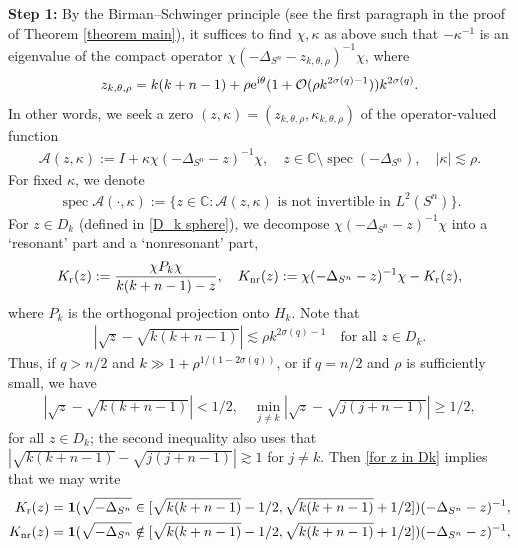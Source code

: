 \documentclass[12pt]{amsart}
\newcommand{\e}{{\rm e}}
\newcommand{\C}{{\mathbb C}}
\newcommand\I{\mathrm{i}}
\DeclareMathOperator{\spec}{spec}
\newcommand\jc[1]{\textcolor{black}{#1}}
\begin{document}
\textbf{Step 1:} By the Birman--Schwinger principle (see the first paragraph in the proof of Theorem \ref{theorem main}), it suffices to find $\chi,\kappa$ as above such that $-\kappa^{-1}$ is an eigenvalue of the compact operator $\chi(-\Delta_{S^n}-z_{k,\theta,\rho})^{-1}\chi$, where
\begin{align}\label{def z_k,theta,rho}
   z_{k,\theta,\rho}=k(k+n-1)+\rho\e^{\I\theta}(1+\mathcal{O}(\rho k^{2\sigma(q)-1})) k^{2\sigma(q)}.
\end{align}
In other words, we seek a zero $(z,\kappa)=(z_{k,\theta,\rho},\kappa_{k,\theta,\rho})$ of the operator-valued function 
\begin{align}\label{def A(zeta)}
    \mathcal{A}(z,\kappa):=I+\kappa\chi(-\Delta_{S^n}-z)^{-1}\chi,\quad z\in\C\setminus\spec(-\Delta_{S^n}),\quad|\kappa|\lesssim\rho.
\end{align}
For fixed $\kappa$, we denote 
\begin{align}
    \spec{\mathcal{A}(\cdot,\kappa)}:=\{z\in\C:\mathcal{A}(z,\kappa) \mbox{ is not invertible in } L^2(S^n)\}.
\end{align}
For $z\in D_k$ (defined in \eqref{D_k sphere}), we decompose $\chi(-\Delta_{S^n} - z)^{-1}\chi$ into a ‘resonant’ part and a ‘nonresonant’ part,
\begin{align}\label{def Ksing, Kreg}
K_{\rm r}(z):=\frac{\chi P_k\chi}{k(k+n-1)-z},\quad  K_{\rm nr}(z):=\chi(-\Delta_{S^n}-z)^{-1}\chi-K_{\rm r}(z), 
\end{align}
where $P_k$ is the orthogonal projection onto $H_k$.
Note that 
\begin{align}\label{for z in Dk}
    |\sqrt{z}-\sqrt{k(k+n-1)}|\lesssim \rho k^{2\sigma(q)-1}\quad\mbox{for all } z\in D_k.
\end{align}
Thus, if $q>n/2$ and \jc{$k\gg 1+\rho^{1/(1-2\sigma(q))}$}, or if $q=n/2$ and $\rho$ is sufficiently small, we have
\begin{align}
    |\sqrt{z}-\sqrt{k(k+n-1)}|<1/2,\quad \min_{j\neq k}|\sqrt{z}-\sqrt{j(j+n-1)}|\geq 1/2,
\end{align}
for all $z\in D_k$; the second inequality also uses that $|\sqrt{k(k+n-1)}-\sqrt{j(j+n-1)}|\gtrsim 1$ for $j\neq k$. Then \eqref{for z in Dk} implies that we may write
\begin{align}
 K_{\rm r}(z)&=\mathbf{1}(\sqrt{-\Delta_{S^n}}\in [\sqrt{k(k+n-1)}-1/2,\sqrt{k(k+n-1)}+1/2])(-\Delta_{S^n}-z)^{-1},\\   
 K_{\rm nr}(z)&=\mathbf{1}(\sqrt{-\Delta_{S^n}}\notin [\sqrt{k(k+n-1)}-1/2,\sqrt{k(k+n-1)}+1/2])(-\Delta_{S^n}-z)^{-1},   
\end{align}
\end{document}
